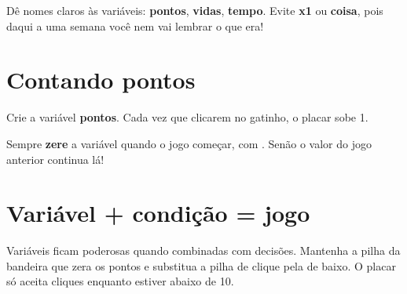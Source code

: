 \begin{dica}
Dê nomes claros às variáveis: \textbf{pontos}, \textbf{vidas}, \textbf{tempo}. Evite \textbf{x1} ou \textbf{coisa}, pois daqui a uma semana você nem vai lembrar o que era!
\end{dica}

\section{Contando pontos}

\begin{missao}
Crie a variável \textbf{pontos}. Cada vez que clicarem no gatinho, o placar sobe 1.
\end{missao}

\begin{codigo}
\begin{pilha}
\end{pilha}
\begin{pilha}
\end{pilha}
\end{codigo}

\begin{cuidado}
Sempre \textbf{zere} a variável quando o jogo começar, com . Senão o valor do jogo anterior continua lá!
\end{cuidado}

\section{Variável + condição = jogo}

Variáveis ficam poderosas quando combinadas com decisões. Mantenha a pilha da bandeira que zera os pontos e substitua a pilha de clique pela de baixo. O placar só aceita cliques enquanto estiver abaixo de 10.

\begin{codigo}[Ganhou!]
\begin{pilha}
\sbcend
\sbcend
\end{pilha}
\begin{pilha}
\end{pilha}
\end{codigo}

